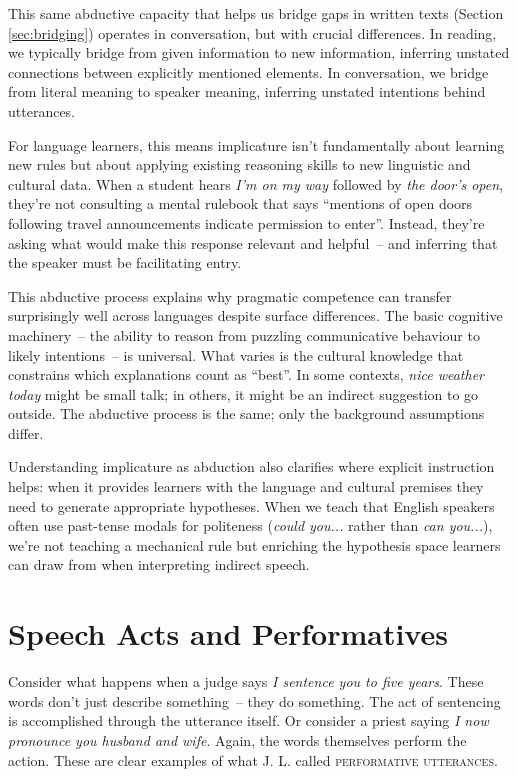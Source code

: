 This same abductive capacity that helps us bridge gaps in written texts (Section \ref{sec:bridging}) operates in conversation, but with crucial differences. In reading, we typically bridge from given information to new information, inferring unstated connections between explicitly mentioned elements. In conversation, we bridge from literal meaning to speaker meaning, inferring unstated intentions behind utterances.

For language learners, this means implicature isn't fundamentally about learning new rules but about applying existing reasoning skills to new linguistic and cultural data. When a student hears \textit{I'm on my way} followed by \textit{the door's open}, they're not consulting a mental rulebook that says ``mentions of open doors following travel announcements indicate permission to enter''. Instead, they're asking what would make this response relevant and helpful~-- and inferring that the speaker must be facilitating entry.

This abductive process explains why pragmatic competence can transfer surprisingly well across languages despite surface differences. The basic cognitive machinery~-- the ability to reason from puzzling communicative behaviour to likely intentions~-- is universal. What varies is the cultural knowledge that constrains which explanations count as ``best''. In some contexts, \textit{nice weather today} might be small talk; in others, it might be an indirect suggestion to go outside. The abductive process is the same; only the background assumptions differ.

Understanding implicature as abduction also clarifies where explicit instruction helps: when it provides learners with the language and cultural premises they need to generate appropriate hypotheses. When we teach that English speakers often use past-tense modals for politeness (\textit{could you...} rather than \textit{can you...}), we're not teaching a mechanical rule but enriching the hypothesis space learners can draw from when interpreting indirect speech.

\section{Speech Acts and Performatives}\label{sec:speech-acts}

Consider what happens when a judge says \textit{I sentence you to five years}. These words don't just describe something~-- they do something. The act of sentencing is accomplished through the utterance itself. Or consider a priest saying \textit{I now pronounce you husband and wife}. Again, the words themselves perform the action. These are clear examples of what J. L. \citet{austin1962} called \textsc{performative utterances}.

